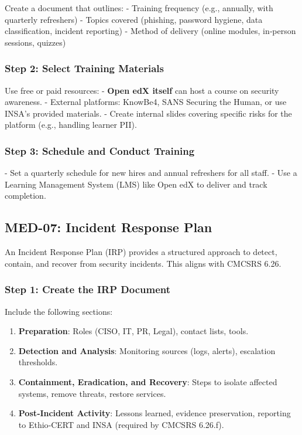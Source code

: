 Create a document that outlines:
- Training frequency (e.g., annually, with quarterly refreshers)
- Topics covered (phishing, password hygiene, data classification, incident reporting)
- Method of delivery (online modules, in‑person sessions, quizzes)

\subsubsection{Step 2: Select Training Materials}

Use free or paid resources:
- \textbf{Open edX itself} can host a course on security awareness.
- External platforms: KnowBe4, SANS Securing the Human, or use INSA's provided materials.
- Create internal slides covering specific risks for the platform (e.g., handling learner PII).

\subsubsection{Step 3: Schedule and Conduct Training}

- Set a quarterly schedule for new hires and annual refreshers for all staff.
- Use a Learning Management System (LMS) like Open edX to deliver and track completion.

\subsection{MED-07: Incident Response Plan}

An Incident Response Plan (IRP) provides a structured approach to detect, contain, and recover from security incidents. This aligns with CMCSRS 6.26.

\subsubsection{Step 1: Create the IRP Document}

Include the following sections:
\begin{enumerate}
    \item \textbf{Preparation}: Roles (CISO, IT, PR, Legal), contact lists, tools.
    \item \textbf{Detection and Analysis}: Monitoring sources (logs, alerts), escalation thresholds.
    \item \textbf{Containment, Eradication, and Recovery}: Steps to isolate affected systems, remove threats, restore services.
    \item \textbf{Post‑Incident Activity}: Lessons learned, evidence preservation, reporting to Ethio‑CERT and INSA (required by CMCSRS 6.26.f).
\end{enumerate}

